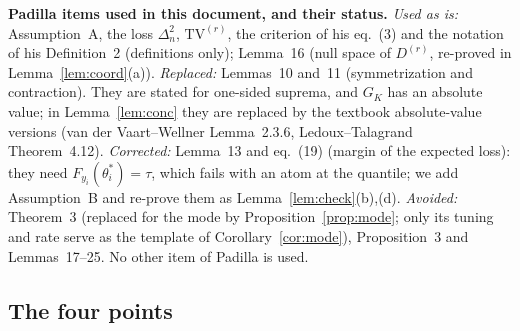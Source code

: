 \documentclass[11pt]{article}
\theoremstyle{definition}
\theoremstyle{remark}
\newcommand{\TV}{\mathrm{TV}}
\newcommand{\Dr}{D^{(r)}}
\newcommand{\thetas}{\theta^{*}}
\begin{document}
\smallskip
\noindent\textbf{Padilla items used in this document, and their status.}
\emph{Used as is:} Assumption~A, the loss $\Delta_n^2$, $\TV^{(r)}$, the criterion of his eq.~(3) and the notation of his Definition~2 (definitions only); Lemma~16 (null space of $\Dr$, re-proved in Lemma~\ref{lem:coord}(a)).
\emph{Replaced:} Lemmas~10 and~11 (symmetrization and contraction). They are stated for one-sided suprema, and $G_K$ has an absolute value; in Lemma~\ref{lem:conc} they are replaced by the textbook absolute-value versions (van der Vaart--Wellner Lemma~2.3.6, Ledoux--Talagrand Theorem~4.12).
\emph{Corrected:} Lemma~13 and eq.~(19) (margin of the expected loss): they need $F_{y_i}(\thetas_i)=\tau$, which fails with an atom at the quantile; we add Assumption~B and re-prove them as Lemma~\ref{lem:check}(b),(d).
\emph{Avoided:} Theorem~3 (replaced for the mode by Proposition~\ref{prop:mode}; only its tuning and rate serve as the template of Corollary~\ref{cor:mode}), Proposition~3 and Lemmas~17--25.
No other item of Padilla is used.

\subsection{The four points}
\end{document}
